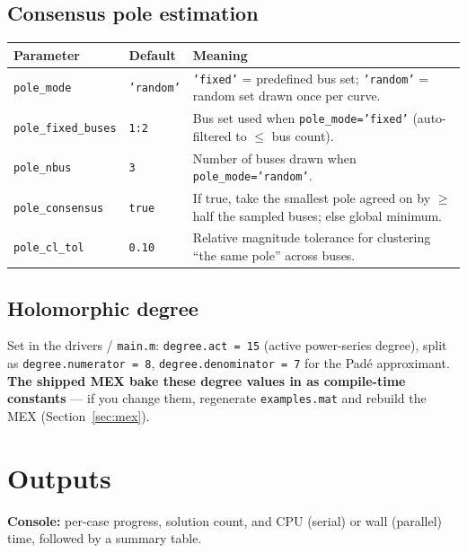 \documentclass[11pt,a4paper]{article}
\newcommand{\code}[1]{\texttt{#1}}
\begin{document}
\subsection{Consensus pole estimation}
\begin{center}\small
\begin{longtable}{@{}p{}p{}p{}@{}}
\toprule
\textbf{Parameter} & \textbf{Default} & \textbf{Meaning}\\
\midrule\endhead
\code{pole_mode}       & \code{'random'} & \code{'fixed'} = predefined bus set; \code{'random'} = random set drawn once per curve.\\
\code{pole_fixed_buses}& \code{1:2}      & Bus set used when \code{pole_mode='fixed'} (auto-filtered to $\le$ bus count).\\
\code{pole_nbus}       & \code{3}        & Number of buses drawn when \code{pole_mode='random'}.\\
\code{pole_consensus}  & \code{true}     & If true, take the smallest pole agreed on by $\ge$ half the sampled buses; else global minimum.\\
\code{pole_cl_tol}     & \code{0.10}     & Relative magnitude tolerance for clustering ``the same pole'' across buses.\\
\bottomrule
\end{longtable}
\end{center}

\subsection{Holomorphic degree}
Set in the drivers / \code{main.m}: \code{degree.act = 15} (active power-series degree),
split as \code{degree.numerator = 8}, \code{degree.denominator = 7} for the Pad\'e
approximant. \textbf{The shipped MEX bake these degree values in as compile-time
constants} --- if you change them, regenerate \code{examples.mat} and rebuild the MEX
(Section~\ref{sec:mex}).

\section{Outputs}

\textbf{Console:} per-case progress, solution count, and CPU (serial) or wall (parallel)
time, followed by a summary table.
\end{document}
